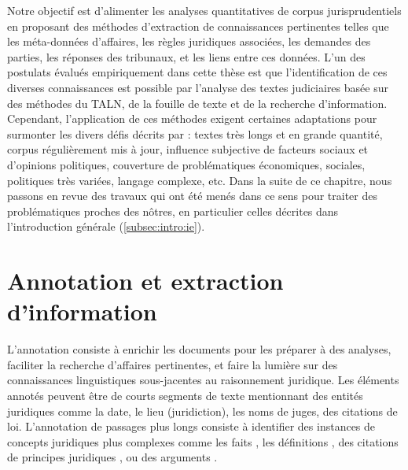 Notre objectif est d'alimenter les analyses quantitatives de corpus jurisprudentiels en proposant des méthodes d'extraction de connaissances pertinentes telles que les méta-données d'affaires, les règles juridiques associées, les demandes des parties, les réponses des tribunaux, et les liens entre ces données. L'un des postulats évalués empiriquement dans cette thèse est que l'identification de ces diverses connaissances est possible par l'analyse des textes judiciaires basée sur des méthodes du 
TALN, %
de la fouille de texte %
et de la recherche d'information. %
Cependant, l'application de ces méthodes exigent certaines adaptations pour surmonter les divers défis décrits par \citet{narazenko2017legalnlpintro}: textes très longs et en grande quantité, corpus régulièrement mis à jour, influence subjective de facteurs sociaux et d'opinions politiques, couverture de problématiques économiques, sociales, politiques très variées, langage complexe, etc. Dans la suite de ce chapitre, nous passons en revue des travaux qui ont été menés dans ce sens pour traiter des problématiques proches des nôtres, en particulier celles décrites dans l'introduction générale (\ref{subsec:intro:ie}). 

\section{Annotation et extraction d'information}

L'annotation consiste à enrichir les documents pour les préparer à des analyses, faciliter la recherche d'affaires pertinentes, et faire la lumière sur des connaissances linguistiques sous-jacentes au raisonnement juridique. Les éléments annotés peuvent être de courts segments de texte mentionnant des entités juridiques \citep{Waltl2016lexia, wyner2010extractlegalelts} comme la date, le lieu (juridiction), les noms de juges, des citations de loi.  L'annotation de passages plus longs consiste à identifier des instances de concepts juridiques plus complexes comme les faits \citep{wyner2010extractlegalelts, wyner2010casefactors, Shulayeva2017recognfactprincip}, les définitions \citep{Waltl2016lexia,waltl2017legaliegerman}, des citations de principes juridiques \citep{Shulayeva2017recognfactprincip}, ou des arguments \citep{WynerMoens2010mineargument}. 

